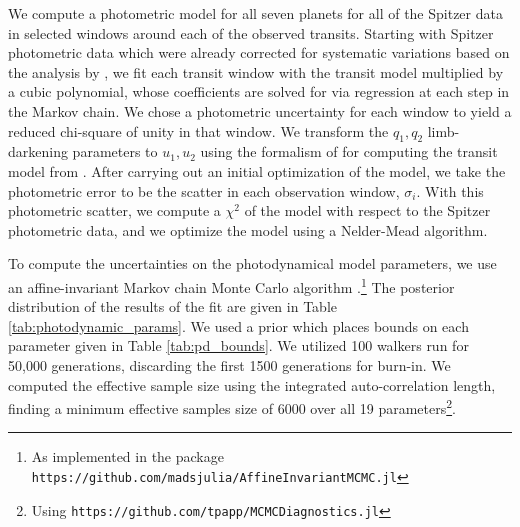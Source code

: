 \documentclass[twocolumn]{aastex63}
\begin{document}
We compute a photometric model for all seven
planets for all of the Spitzer data in selected windows around each of the observed
transits.  Starting with Spitzer photometric data which were already corrected for systematic
variations based on the analysis by \citet{Ducrot2020}, we fit  each transit window
with the transit model multiplied by a cubic polynomial, whose coefficients are solved
for via regression at each step in the Markov chain.  We chose a photometric uncertainty
for each window to yield a reduced chi-square of unity in that  window.  We 
transform the $q_1, q_2$ limb-darkening 
parameters to $u_1,u_2$ using the formalism of \citet{Kipping2013} for computing the transit model from \citet{Agol2019}.  After carrying out an initial
optimization of the model, we take the photometric error to be the
scatter in each observation window, $\sigma_i$.  With this photometric
scatter, we compute a $\chi^2$ of the model with respect to the Spitzer
photometric data, and we optimize the model using a Nelder-Mead algorithm.

To compute the uncertainties on the photodynamical model parameters, we
use an affine-invariant Markov chain Monte Carlo algorithm \citep{Goodman2010}.\footnote{As
implemented in the package \texttt{https://github.com/madsjulia/AffineInvariantMCMC.jl}}
The posterior distribution of the results of the fit are given in Table \ref{tab:photodynamic_params}.
We used a prior which places bounds on
each parameter given in 
Table \ref{tab:pd_bounds}.
We utilized 100 walkers run for 50,000 generations, discarding the first 1500 generations 
for burn-in.  We computed the effective sample size using the integrated
auto-correlation length, finding a minimum effective samples size of 6000 over all 
19 parameters\footnote{Using \texttt{https://github.com/tpapp/MCMCDiagnostics.jl}}.
\end{document}
